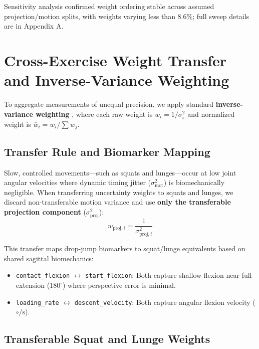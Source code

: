 Sensitivity analysis confirmed weight ordering stable across assumed projection/motion splits, with weights varying less than 8.6\%; full sweep details are in Appendix A.



\section{Cross-Exercise Weight Transfer and Inverse-Variance Weighting}
\label{sec:8-4-cross-exercise-weight-transfer-and-inverse-variance-weighting}


To aggregate measurements of unequal precision, we apply standard \textbf{inverse-variance weighting} \citep{Borenstein_2013}, where each raw weight is $w_i = 1 / \sigma_i^2$ and normalized weight is $\bar{w}_i = w_i / \sum w_j$.

\subsection{Transfer Rule and Biomarker Mapping}
\label{sec:8-4-1-transfer-rule-and-biomarker-mapping}

Slow, controlled movements—such as squats and lunges—occur at low joint angular velocities where dynamic timing jitter ($\sigma^2_{\text{mot}}$) is biomechanically negligible. When transferring uncertainty weights to squats and lunges, we discard non-transferable motion variance and use \textbf{only the transferable projection component} ($\sigma^2_{\text{proj}}$):
\begin{equation}
  w_{\text{proj}, i} = \frac{1}{\sigma^2_{\text{proj}, i}}
  \label{eq:disp2}
\end{equation}

This transfer maps drop-jump biomarkers to squat/lunge equivalents based on shared sagittal biomechanics:
\begin{itemize}
  \item \texttt{contact\_flexion} $\leftrightarrow$ \texttt{start\_flexion}: Both capture shallow flexion near full extension ($180^\circ$) where perspective error is minimal.
  \item \texttt{loading\_rate} $\leftrightarrow$ \texttt{descent\_velocity}: Both capture angular flexion velocity ($\circ/\text{s}$).
\end{itemize}

\subsection{Transferable Squat and Lunge Weights}
\label{sec:8-4-2-transferable-squat-and-lunge-weights}

